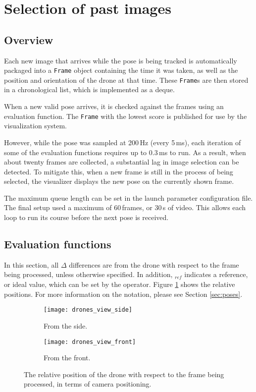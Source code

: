 \section{Selection of past images}
  \subsection{Overview}
    Each new image that arrives while the pose is being tracked is automatically packaged into a \texttt{Frame} object containing the time it was taken, as well as the position and orientation of the drone at that time.
    These \texttt{Frame}s are then stored in a chronological list, which is implemented as a deque.

    When a new valid pose arrives, it is checked against the frames using an evaluation function.
    The \texttt{Frame} with the lowest score is published for use by the visualization system.

    However, while the pose was sampled at 200\,Hz (every 5\,ms), each iteration of some of the evaluation functions requires up to 0.3\,ms to run.
    As a result, when about twenty frames are collected, a substantial lag in image selection can be detected.
    To mitigate this, when a new frame is still in the process of being selected, the visualizer displays the new pose on the currently shown frame.

    The maximum queue length can be set in the launch parameter configuration file.
    The final setup used a maximum of 60\,frames, or 30\,s of video.
    This allows each loop to run its course before the next pose is received.

  \subsection{Evaluation functions}
    In this section, all $\Delta$ differences are from the drone with respect to the frame being processed, unless otherwise specified.
    In addition, $_{ref}$ indicates a reference, or ideal value, which can be set by the operator.
    Figure \ref{fig:drones_view} shows the relative positions. For more information on the notation, please see Section \ref{sec:poses}.

    \begin{figure}[h]
      \centering
      \begin{subfigure}[b]{0.45\textwidth}
	\texttt{[image: drones\_view\_side]}
	\caption{From the side.}
      \end{subfigure}
      \hfill
      \begin{subfigure}[b]{0.45\textwidth}
	\texttt{[image: drones\_view\_front]}
	\caption{From the front.}
      \end{subfigure}
      \caption[Relative positions]{The relative position of the drone with respect to the frame being processed, in terms of camera positioning.}
      \label{fig:drones_view}
    \end{figure}

